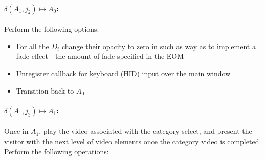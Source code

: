 \documentclass[10pt]{article}
\begin{document}
\paragraph{$\delta(A_{1}, j_{2}) \mapsto A_{0}$:} 

Perform the following options:

\begin{itemize}
	\item For all the $D_{i}$ change their opacity to zero in such as way as to implement a fade effect - the amount of fade specified in the EOM
	\item Unregister callback for keyboard (HID) input over the main window 
	\item Transition back to $A_{0}$
\end{itemize}

\paragraph{$\delta(A_{1}, j_{3}) \mapsto A_{1}$:}

Once in $A_{1}$, play the video associated with the category select, and present the visitor with the next level of video elements once the category video is completed. Perform the following operations:
\end{document}
